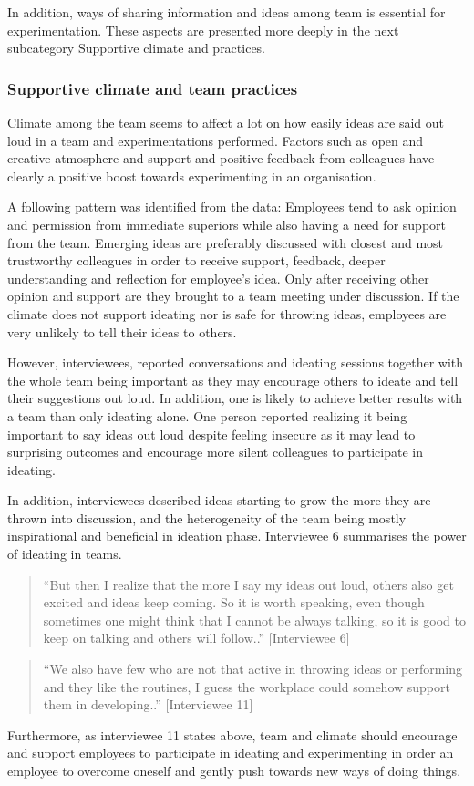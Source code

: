 In addition, ways of sharing information and ideas among team is essential for experimentation. These aspects are presented more deeply in the next subcategory Supportive climate and practices. 


\subsubsection{Supportive climate and team practices}
Climate among the team seems to affect a lot on how easily ideas are said out loud in a team and experimentations performed. Factors such as open and creative atmosphere and support and positive feedback from colleagues have clearly a positive boost towards experimenting in an organisation.

A following pattern was identified from the data: Employees tend to ask opinion and permission from immediate superiors while also having a need for support from the team. Emerging ideas are preferably discussed with closest and most trustworthy colleagues in order to receive support, feedback, deeper understanding and reflection for employee's idea. Only after receiving other opinion and support are they brought to a team meeting under discussion. If the climate does not support ideating nor is safe for throwing ideas, employees are very unlikely to tell their ideas to others. 

However, interviewees, reported conversations and ideating sessions together with the whole team being important as they may encourage others to ideate and tell their suggestions out loud. In addition, one is likely to achieve better results with a team than only ideating alone. One person reported realizing it being important to say ideas out loud despite feeling insecure as it may lead to surprising outcomes and encourage more silent colleagues to participate in ideating. 

In addition, interviewees described ideas starting to grow the more they are thrown into discussion, and the heterogeneity of the team being mostly inspirational and beneficial in ideation phase. Interviewee 6 summarises the power of ideating in teams. 
\begin{quote}
``But then I realize that the more I say my ideas out loud, others also get excited and ideas keep coming. So it is worth speaking, even though sometimes one might think that I cannot be always talking, so it is good to keep on talking and others will follow..'' [Interviewee 6]
\end{quote}
\begin{quote}
``We also have few who are not that active in throwing ideas or performing and they like the routines, I guess the workplace could somehow support them in developing..'' [Interviewee 11]
\end{quote}
Furthermore, as interviewee 11 states above, team and climate should encourage and support employees to participate in ideating and experimenting in order an employee to overcome oneself and gently push towards new ways of doing things. 

